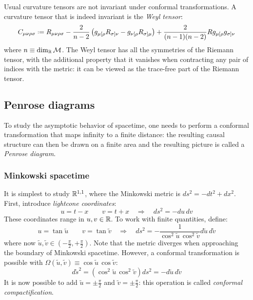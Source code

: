 Usual curvature tensors are not invariant under conformal transformations. A curvature tensor that is indeed invariant is the \textit{Weyl tensor}:
\begin{equation}
  C_{\mu \nu \rho \sigma} \defeq R_{\mu \nu \rho \sigma} - \frac{2}{n - 2} \left( g_{\mu [\rho} R_{\sigma] \nu} - g_{\nu [\rho} R_{\sigma] \mu} \right) + \frac{2}{(n-1)(n-2)} R g_{\mu [\rho} g_{\sigma] \nu}
  \label{eq:4.35}
\end{equation}
where $ n \equiv \dim_{\mathbb{R}}\mathcal{M} $. The Weyl tensor has all the symmetries of the Riemann tensor, with the additional property that it vanishes when contracting any pair of indices with the metric: it can be viewed as the trace-free part of the Riemann tensor.

\subsection{Penrose diagrams}

To study the asymptotic behavior of spacetime, one needs to perform a conformal transformation that maps infinity to a finite distance: the resulting causal structure can then be drawn on a finite area and the resulting picture is called a \textit{Penrose diagram}.

\subsubsection{Minkowski spacetime}

It is simplest to study $ \mathbb{R}^{1,1} $, where the Minkowski metric is $ ds^2 = -dt^2 + dx^2 $. First, introduce \textit{lightcone coordinates}:
\begin{equation*}
  u = t - x
  \qquad
  v = t + x
  \quad \Rightarrow \quad
  ds^2 = - du\, dv
\end{equation*}
These coordinates range in $ u,v \in \mathbb{R} $. To work with finite quantities, define:
\begin{equation*}
  u = \tan \tilde{u}
  \qquad
  v = \tan \tilde{v}
  \quad \Rightarrow \quad
  ds^2 = - \frac{1}{\cos^2 \tilde{u}\, \cos^2 \tilde{v}} d\tilde{u}\, d\tilde{v}
\end{equation*}
where now $ \tilde{u},\tilde{v} \in \left( -\frac{\pi}{2}, +\frac{\pi}{2} \right) $. Note that the metric diverges when approaching the boundary of Minkowski spacetime. However, a conformal transformation is possible with $ \Omega(\tilde{u},\tilde{v}) \equiv \cos \tilde{u}\, \cos \tilde{v} $:
\begin{equation*}
  d\tilde{s}^2 = \left( \cos^2 \tilde{u}\, \cos^2 \tilde{v} \right) ds^2 = - d\tilde{u}\, d\tilde{v}
\end{equation*}
It is now possible to add $ \tilde{u} = \pm \frac{\pi}{2} $ and $ \tilde{v} = \pm \frac{\pi}{2} $: this operation is called \textit{conformal compactification}.

